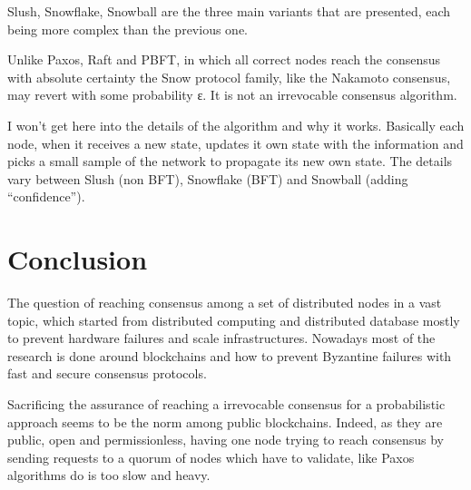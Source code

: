 \documentclass[11pt, twocolumn]{article}
\begin{document}
Slush, Snowflake, Snowball are the three main variants that are presented, each being more complex than the previous one.

Unlike Paxos, Raft and PBFT, in which all correct nodes reach the consensus with absolute certainty the Snow protocol family, like the Nakamoto consensus, may revert with some probability ε. It is not an irrevocable consensus algorithm.

I won't get here into the details of the algorithm and why it works. Basically each node, when it receives a new state, updates it own state with the information and picks a small sample of the network to propagate its new own state. The details vary between Slush (non BFT), Snowflake (BFT) and Snowball (adding “confidence”).

\section{Conclusion}

The question of reaching consensus among a set of distributed nodes in a vast topic, which started from distributed computing and distributed database mostly to prevent hardware failures and scale infrastructures. Nowadays most of the research is done around blockchains and how to prevent Byzantine failures with fast and secure consensus protocols.

Sacrificing the assurance of reaching a irrevocable consensus for a probabilistic approach seems to be the norm among public blockchains. Indeed, as they are public, open and permissionless, having one node trying to reach consensus by sending requests to a quorum of nodes which have to validate, like Paxos algorithms do is too slow and heavy.



\end{document}
